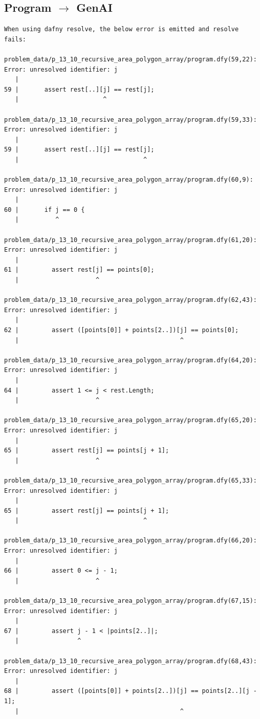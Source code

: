 \documentclass{article}
\begin{document}
\subsection*{Program $\rightarrow$ GenAI}
\begin{lstlisting}
When using dafny resolve, the below error is emitted and resolve fails:

problem_data/p_13_10_recursive_area_polygon_array/program.dfy(59,22): Error: unresolved identifier: j
   |
59 |       assert rest[..][j] == rest[j];
   |                       ^

problem_data/p_13_10_recursive_area_polygon_array/program.dfy(59,33): Error: unresolved identifier: j
   |
59 |       assert rest[..][j] == rest[j];
   |                                  ^

problem_data/p_13_10_recursive_area_polygon_array/program.dfy(60,9): Error: unresolved identifier: j
   |
60 |       if j == 0 {
   |          ^

problem_data/p_13_10_recursive_area_polygon_array/program.dfy(61,20): Error: unresolved identifier: j
   |
61 |         assert rest[j] == points[0];
   |                     ^

problem_data/p_13_10_recursive_area_polygon_array/program.dfy(62,43): Error: unresolved identifier: j
   |
62 |         assert ([points[0]] + points[2..])[j] == points[0];
   |                                            ^

problem_data/p_13_10_recursive_area_polygon_array/program.dfy(64,20): Error: unresolved identifier: j
   |
64 |         assert 1 <= j < rest.Length;
   |                     ^

problem_data/p_13_10_recursive_area_polygon_array/program.dfy(65,20): Error: unresolved identifier: j
   |
65 |         assert rest[j] == points[j + 1];
   |                     ^

problem_data/p_13_10_recursive_area_polygon_array/program.dfy(65,33): Error: unresolved identifier: j
   |
65 |         assert rest[j] == points[j + 1];
   |                                  ^

problem_data/p_13_10_recursive_area_polygon_array/program.dfy(66,20): Error: unresolved identifier: j
   |
66 |         assert 0 <= j - 1;
   |                     ^

problem_data/p_13_10_recursive_area_polygon_array/program.dfy(67,15): Error: unresolved identifier: j
   |
67 |         assert j - 1 < |points[2..]|;
   |                ^

problem_data/p_13_10_recursive_area_polygon_array/program.dfy(68,43): Error: unresolved identifier: j
   |
68 |         assert ([points[0]] + points[2..])[j] == points[2..][j - 1];
   |                                            ^


\end{lstlisting}
\end{document}
